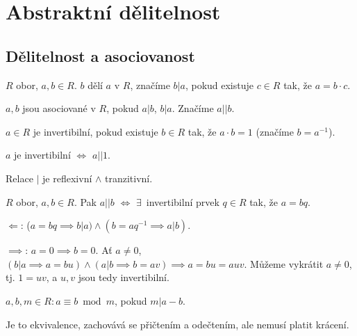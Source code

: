 \documentclass[12pt]{article}                   %
\begin{document}
\section{Abstraktní dělitelnost}
    \subsection{Dělitelnost a asociovanost}
        \begin{definice}
            $R$ obor, $a, b \in R$. $b$ dělí $a$ v $R$, značíme $b|a$, pokud existuje $c \in R$ tak, že $a = b·c$.

            $a, b$ jsou asociované v $R$, pokud $a|b$, $b|a$. Značíme $a||b$.

            $a \in R$ je invertibilní, pokud existuje $b \in R$ tak, že $a·b = 1$ (značíme $b = a^{-1}$).
        \end{definice}

        \begin{pozorovani}
            $a$ je invertibilní $\Leftrightarrow$ $a || 1$.

            Relace $|$ je reflexivní $\land$ tranzitivní.
        \end{pozorovani}

        \begin{tvrzeni}
            $R$ obor, $a, b \in R$. Pak $a||b$ $\Leftrightarrow$ $\exists$~invertibilní prvek $q \in R$ tak, že $a = bq$.

            \begin{dukazin}
                $\Leftarrow$: ($a = bq \implies b | a) \land (b = aq^{-1} \implies a | b)$.

                $\implies$: $a = 0 \implies b = 0$. Ať $a ≠ 0$, $(b|a \implies a = bu) \land (a|b \implies b=av) \implies a = bu = auv$. Můžeme vykrátit $a ≠ 0$, tj. $1 = uv$, a $u, v$ jsou tedy invertibilní.
            \end{dukazin}
        \end{tvrzeni}

        \begin{definice}[Kongruence]
            $a, b, m \in R: a≡b \bmod m$, pokud $m | a - b$.
        \end{definice}

        \begin{pozorovani}
            Je to ekvivalence, zachovává se přičtením a odečtením, ale nemusí platit krácení.
        \end{pozorovani}
\end{document}

